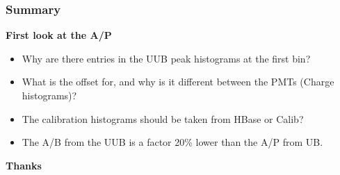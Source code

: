 \documentclass[aspectratio=169]{beamer}
\begin{document}


\begin{frame}
  \frametitle{Summary}
  {\bf First look at the  A/P}

  \begin{itemize}
    \item Why are there entries in the UUB peak histograms at the first bin?
    \item What is the offset for, and why is it different between the PMTs 
      (Charge histograms)?
    \item The calibration histograms should be taken from  HBase or Calib?
    \item The A/B from the UUB is a factor 20\% lower than the A/P from UB.
  \end{itemize}
\end{frame}


\begin{frame}
  \centering
  {\bf\Huge Thanks }
\end{frame}




%
\end{document}
